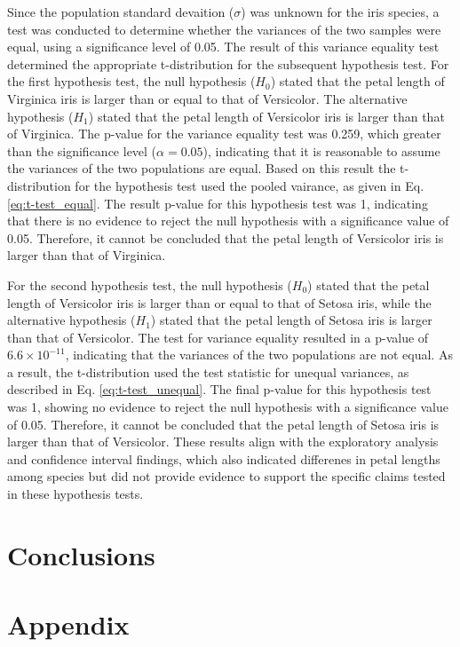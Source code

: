 \documentclass{article}
\begin{document}
Since the population standard devaition ($\sigma$) was unknown for the iris species, a test was conducted to determine whether the variances of the two samples were equal, using a significance level of 0.05. The result of this variance equality test determined the appropriate t-distribution for the subsequent hypothesis test. For the first hypothesis test, the null hypothesis  ($H_0$) stated that the petal length of Virginica iris is larger than or equal to that of Versicolor. The alternative hypothesis ($H_1$) stated that the petal length of Versicolor iris is larger than that of Virginica. The p-value for the variance equality test was 0.259, which greater than the significance level ($\alpha = 0.05$), indicating that it is reasonable to assume the variances of the two populations are equal. Based on this result the t-distribution for the hypothesis test used the pooled vairance, as given in Eq. \ref{eq:t-test_equal}. The result p-value for this hypothesis test was 1, indicating that there is no evidence to reject the null hypothesis with a significance value of 0.05. Therefore, it cannot be concluded that the petal length of Versicolor iris is larger than that of Virginica.

 For the second hypothesis test, the null hypothesis ($H_0$) stated that the petal length of Versicolor iris is larger than or equal to that of Setosa iris, while the alternative hypothesis ($H_1$) stated that the petal length of Setosa iris is larger than that of Versicolor. The test for variance equality resulted in a p-value of $6.6\times10^{-11}$, indicating that the variances of the two populations are not equal. As a result, the t-distribution used the test statistic for unequal variances, as described in Eq. \ref{eq:t-test_unequal}. The final p-value for this hypothesis test was 1, showing no evidence to reject the null hypothesis with a significance value of 0.05. Therefore, it cannot be concluded that the petal length of Setosa iris is larger than that of Versicolor. These results align with the exploratory analysis and confidence interval findings, which also indicated differenes in petal lengths among species but did not provide evidence to support the specific claims tested in these hypothesis tests. 

\section{Conclusions}

\color{black}
\newpage
\section{Appendix}
\end{document}
